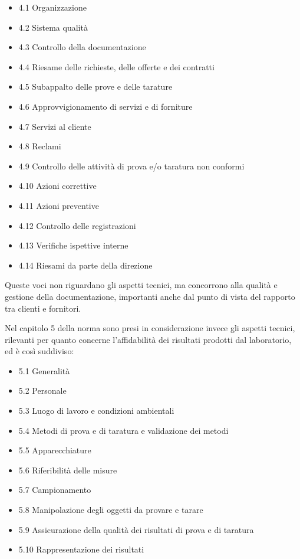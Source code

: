 \documentclass[a4paper, twoside]{article}
\begin{document}
\begin{itemize}
    \item 4.1    Organizzazione
    \item 4.2    Sistema qualità
    \item 4.3    Controllo della documentazione
    \item 4.4    Riesame delle richieste, delle offerte e dei contratti
    \item 4.5    Subappalto delle prove e delle tarature
    \item 4.6    Approvvigionamento di servizi e di forniture
    \item 4.7    Servizi al cliente
    \item 4.8    Reclami
    \item 4.9    Controllo delle attività di prova e/o taratura non conformi
    \item 4.10   Azioni correttive
    \item 4.11   Azioni preventive
    \item 4.12   Controllo delle registrazioni
    \item 4.13   Verifiche ispettive interne
    \item 4.14   Riesami da parte della direzione
\end{itemize}

\noindent
Queste voci non riguardano gli aspetti tecnici, ma concorrono alla qualità e gestione della documentazione, importanti anche dal punto di vista del rapporto tra clienti e fornitori.\par

Nel capitolo 5 della norma sono presi in considerazione invece gli aspetti tecnici, rilevanti per quanto concerne l'affidabilità dei risultati prodotti dal laboratorio, ed è così suddiviso:

\begin{itemize}
    \item 5.1    Generalità
    \item 5.2    Personale
    \item 5.3    Luogo di lavoro e condizioni ambientali
    \item 5.4    Metodi di prova e di taratura e validazione dei metodi
    \item 5.5    Apparecchiature
    \item 5.6    Riferibilità delle misure
    \item 5.7    Campionamento
    \item 5.8    Manipolazione degli oggetti da provare e tarare
    \item 5.9    Assicurazione della qualità dei risultati di prova e di taratura
    \item 5.10   Rappresentazione dei risultati
\end{itemize}
\end{document}
